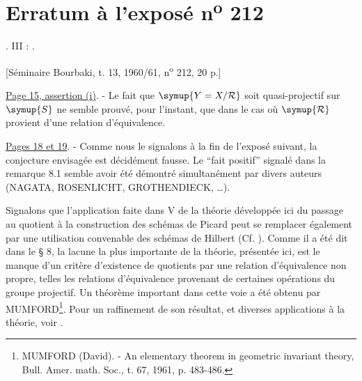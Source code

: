 \clearpage
\chapter*{Erratum à l'exposé n\textsuperscript{o} 212}
\setcounter{footnote}{2}

.  III : .

\begin{center}
[Séminaire Bourbaki, t. 13, 1960/61, n\textsuperscript{o} 212, 20 p.]
\end{center}

\noindent\uline{Page 15, assertion (i)}. - Le fait que $\symup{Y=X/\mathcal R}$ soit
quasi-projectif sur $\symup{S}$ ne semble prouvé, pour l'instant, que dans le cas où
$\symup{\mathcal R}$ provient d'une relation d'équivalence.

\noindent\uline{Pages 18 et 19}. - Comme nous le signalons à la fin de
l'exposé suivant, la conjecture envisagée est décidément fausse. Le ``fait
positif'' signalé dans la remarque 8.1 semble avoir été démontré simultanément
par divers auteurs (NAGATA, ROSENLICHT, GROTHENDIECK, \ldots).

Signalons que l'application faite dans  V de la théorie développée ici du
passage au quotient à la construction des schémas de Picard peut se remplacer
également par une utilisation convenable des schémas de Hilbert (Cf. ).
Comme il a été dit dans le § 8, la lacune la plus importante de la théorie,
présentée
ici, est le manque d'un critère d'existence de quotients par une relation
d'équivalence non propre, telles les relations d'équivalence provenant de
certaines
\begingroup
\makeatletter
\renewcommand\@makefnmark{\hbox{\normalfont(\textsuperscript{\@thefnmark})}}
\makeatother
opérations du groupe projectif. Un théorème important dans cette
voie a été obtenu par MUMFORD\footnote[3]{MUMFORD (David). - An elementary
theorem in geometric invariant theory, Bull. Amer. math. Soc., t. 67,
1961, p. 483-486.}. Pour un raffinement de son résultat, et diverses
applications à la théorie, voir .
\endgroup
